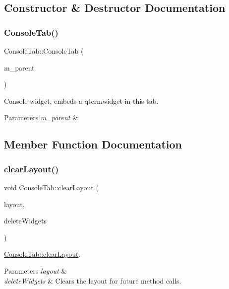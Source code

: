 \subsection{Constructor \& Destructor Documentation}
\mbox{\label{classConsoleTab_a2c631d14f9fe5957e0622e10269e5115}} 
\subsubsection{\texorpdfstring{Console\+Tab()}{ConsoleTab()}}
{\footnotesize\ttfamily Console\+Tab\+::\+Console\+Tab (\begin{DoxyParamCaption}\item[{Q\+Widget $\ast$}]{m\+\_\+parent }\end{DoxyParamCaption})}

Console widget, embeds a qtermwidget in this tab. 
\begin{DoxyParams}{Parameters}
{\em m\+\_\+parent} & \\
\hline
\end{DoxyParams}


\subsection{Member Function Documentation}
\mbox{\label{classConsoleTab_aae70e23b23e401b219edefcac4882eaf}} 
\subsubsection{\texorpdfstring{clear\+Layout()}{clearLayout()}}
{\footnotesize\ttfamily void Console\+Tab\+::clear\+Layout (\begin{DoxyParamCaption}\item[{Q\+Layout $\ast$}]{layout,  }\item[{bool}]{delete\+Widgets }\end{DoxyParamCaption})}



\hyperlink{classConsoleTab_aae70e23b23e401b219edefcac4882eaf}{Console\+Tab\+::clear\+Layout}. 


\begin{DoxyParams}{Parameters}
{\em layout} & \\
\hline
{\em delete\+Widgets} & Clears the layout for future method calls. \\
\hline
\end{DoxyParams}
\mbox{\label{classConsoleTab_a7b2d0987db00c8b9af7ece7b36a82624}} 
